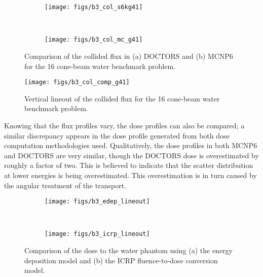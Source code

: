 \begin{figure}
    \centering
    \begin{subfigure}[b]{0.45\textwidth}
        \texttt{[image: figs/b3\_col\_s6kg41]}
        \caption{}
        \label{fig:b3_dr_col}
    \end{subfigure}
    ~
    \begin{subfigure}[b]{0.45\textwidth}
        \texttt{[image: figs/b3\_col\_mc\_g41]}
        \caption{}
        \label{fig:b3_mc_col}
    \end{subfigure}
    \caption{Comparison of the collided flux in (a) DOCTORS and (b) MCNP6 for the 16 cone-beam water benchmark problem.}\label{fig:b3_col}
\end{figure}

\begin{figure}[tb]
  \begin{center}
   \texttt{[image: figs/b3\_col\_comp\_g41]}
  \end{center}
  \caption{Vertical lineout of the collided flux for the 16 cone-beam water benchmark problem.}
\label{fig:b3_col_comp_g41}
\end{figure}

Knowing that the flux profiles vary, the dose profiles can also be compared; a similar discrepancy appears in the dose profile generated from both dose computation methodologies used. Qualitatively, the dose profiles in both MCNP6 and DOCTORS are very similar, though the DOCTORS dose is overestimated by roughly a factor of two. This is believed to indicate that the scatter distribution at lower energies is being overestimated. This overestimation is in turn caused by the angular treatment of the transport.

\begin{figure}
    \centering
    \begin{subfigure}[b]{0.45\textwidth}
        \texttt{[image: figs/b3\_edep\_lineout]}
        \caption{}
        \label{fig:b3_edep_lineout}
    \end{subfigure}
    ~
    \begin{subfigure}[b]{0.45\textwidth}
        \texttt{[image: figs/b3\_icrp\_lineout]}
        \caption{}
        \label{fig:b3_icrp_lineout}
    \end{subfigure}
    \caption{Comparison of the dose to the water phantom using (a) the energy deposition model and (b) the ICRP fluence-to-dose conversion model.}\label{fig:b3_dose}
\end{figure}

